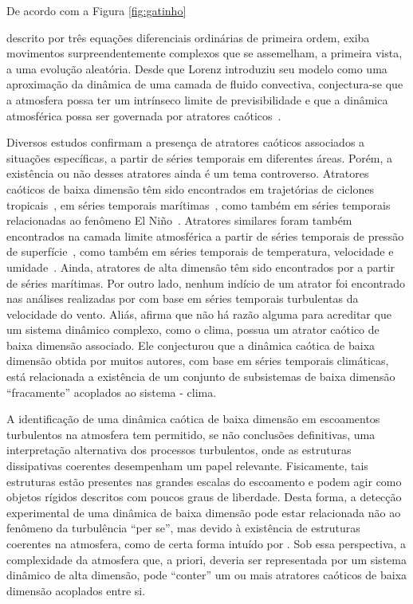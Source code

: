 De acordo com a Figura \ref{fig:gatinho}

descrito por três equações diferenciais ordinárias de primeira ordem, exiba movimentos surpreendentemente complexos que se assemelham, a primeira vista, a uma evolução aleatória. Desde que Lorenz introduziu seu modelo como uma aproximação da dinâmica de uma camada de fluido convectiva, conjectura-se que a atmosfera possa ter um intrínseco limite de previsibilidade e que a dinâmica atmosférica possa ser governada por atratores caóticos~\cite{weber/95}. 

Diversos estudos confirmam a presença de atratores caóticos associados a situações específicas, a partir de séries temporais em diferentes áreas. Porém, a existência ou não desses atratores ainda é um tema controverso. Atratores caóticos de baixa dimensão têm sido encontrados em trajetórias de ciclones tropicais~\cite{fraedrichandleslie/89}, em séries temporais marítimas~\cite{fraedrich/86,nicolis/84}, como também em séries temporais relacionadas ao fenômeno El Niño~\cite{goberelnino/92}. Atratores similares foram também encontrados na camada limite atmosférica a partir de séries temporais de pressão de superfície~\cite{fraedrich/86}, como também em séries temporais de temperatura, velocidade e umidade~\cite{xin/01,jaramillo/93,gallego/01,tiong/93}. Ainda, atratores de alta dimensão têm sido encontrados por  a partir de séries marítimas. Por outro lado, nenhum indício de um atrator foi encontrado nas análises realizadas por  com base em séries temporais turbulentas da velocidade do vento. Aliás,  afirma que não há razão alguma para acreditar que um sistema dinâmico complexo, como o clima, possua um atrator caótico de baixa dimensão associado. Ele conjecturou que a dinâmica caótica de baixa dimensão obtida por muitos autores, com base em séries temporais climáticas, está relacionada a existência de um conjunto de subsistemas de baixa dimensão ``fracamente'' acoplados ao sistema - clima.

A identificação de uma dinâmica caótica de baixa dimensão em escoamentos turbulentos na atmosfera tem permitido, se não conclusões definitivas, uma interpretação alternativa dos processos turbulentos, onde as estruturas dissipativas coerentes desempenham um papel relevante. Fisicamente, tais estruturas estão presentes nas grandes escalas do escoamento e podem agir como objetos rígidos descritos com poucos graus de liberdade. Desta forma, a detecção experimental de uma dinâmica de baixa dimensão pode estar relacionada não ao fenômeno da turbulência ``per se'', mas devido à existência de estruturas coerentes na atmosfera, como de certa forma intuído por . Sob essa perspectiva, a complexidade da atmosfera que, a priori, deveria ser representada por um sistema dinâmico de alta dimensão, pode ``conter'' um ou mais atratores caóticos de baixa dimensão acoplados entre si.

